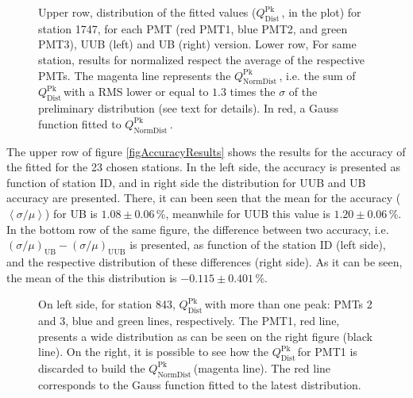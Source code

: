 \documentclass[twoside, final, 10pt]{articleMine}
\newcommand{\qpkDist}{$Q^\mathrm{Pk}_\mathrm{Dist}$\,}
\newcommand{\qpkNormDist}{$Q^\mathrm{Pk}_\mathrm{NormDist}$\,}
\begin{document}
\begin{figure}[!t]
  \centering
  \caption{Upper row, distribution of the fitted \qpkvem values
  (\qpkDist, in the plot) for station 1747, for each PMT (red
  PMT1, blue PMT2, and green PMT3), UUB (left) and UB (right)
  version. Lower row, For same station, results for \qpkvem
  normalized respect the average of the respective PMTs. The
  magenta line represents the \qpkNormDist, i.e. the sum of
  \qpkDist with a RMS lower or equal to $1.3$ times the $\sigma$
  of the preliminary distribution (see text for details). In red,
  a Gauss function fitted to \qpkNormDist.}
  \label{fig1747QpkValues}
\end{figure}

\noindent The upper row of figure \ref{figAccuracyResults} shows
the results for the accuracy of the fitted \qpkvem for the 23
chosen stations. In the left side, the accuracy is presented as
function of station ID, and in right side the distribution for
UUB and UB accuracy are presented. There, it can been seen that
the mean for the accuracy ($\left<\sigma/\mu \right>$) for UB is
$1.08\pm0.06$\,\%, meanwhile for UUB this value is
$1.20\pm0.06$\,\%. In the bottom row of the same figure, the
difference between two accuracy, i.e.
$\left(\sigma/\mu\right)_{\mathrm{UB}}
-\left(\sigma/\mu\right)_{\mathrm{UUB}}$ is presented, as
function of the station ID (left side), and the respective
distribution of these differences (right side). As it can be
seen, the mean of the this distribution is $-0.115\pm0.401$\,\%.
\clearpage

\begin{figure}[!t]
  \centering
  \caption{On left side, for station 843, \qpkDist with more than
  one peak: PMTs 2 and 3, blue and green lines, respectively. The
  PMT1, red line, presents a wide distribution as can be seen on
  the right figure (black line). On the right, it is possible to
  see how the \qpkDist for PMT1 is discarded to build the
  \qpkNormDist (magenta line). The red line corresponds to
  the Gauss function fitted to the latest distribution.}
  \label{figMultipleQpksSt843}
\end{figure}
\end{document}
